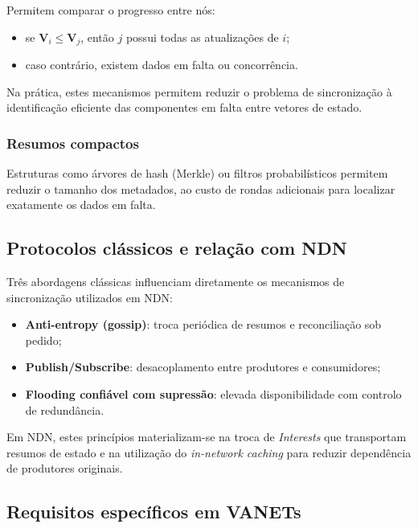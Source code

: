 Permitem comparar o progresso entre nós:

\begin{itemize}
    \item se $\mathbf{V}_i \le \mathbf{V}_j$, então $j$ possui todas as atualizações de $i$;
    \item caso contrário, existem dados em falta ou concorrência.
\end{itemize}

Na prática, estes mecanismos permitem reduzir o problema de sincronização à identificação eficiente das componentes em falta entre vetores de estado.

\subsubsection*{Resumos compactos}

Estruturas como árvores de hash (Merkle) ou filtros probabilísticos permitem reduzir o tamanho dos metadados, ao custo de rondas adicionais para localizar exatamente os dados em falta.

\subsection{Protocolos clássicos e relação com NDN}
\label{sub:protocolos_classicos}

Três abordagens clássicas influenciam diretamente os mecanismos de sincronização utilizados em \gls{NDN}:

\begin{itemize}
    \item \textbf{Anti-entropy (gossip)}: troca periódica de resumos e reconciliação sob pedido;
    \item \textbf{Publish/Subscribe}: desacoplamento entre produtores e consumidores;
    \item \textbf{Flooding confiável com supressão}: elevada disponibilidade com controlo de redundância.
\end{itemize}

Em \gls{NDN}, estes princípios materializam-se na troca de \textit{Interests} que transportam resumos de estado e na utilização do \textit{in-network caching} para reduzir dependência de produtores originais.

\subsection{Requisitos específicos em \gls{VANETs}}
\label{sub:desafios_requisitos_veiculares}

